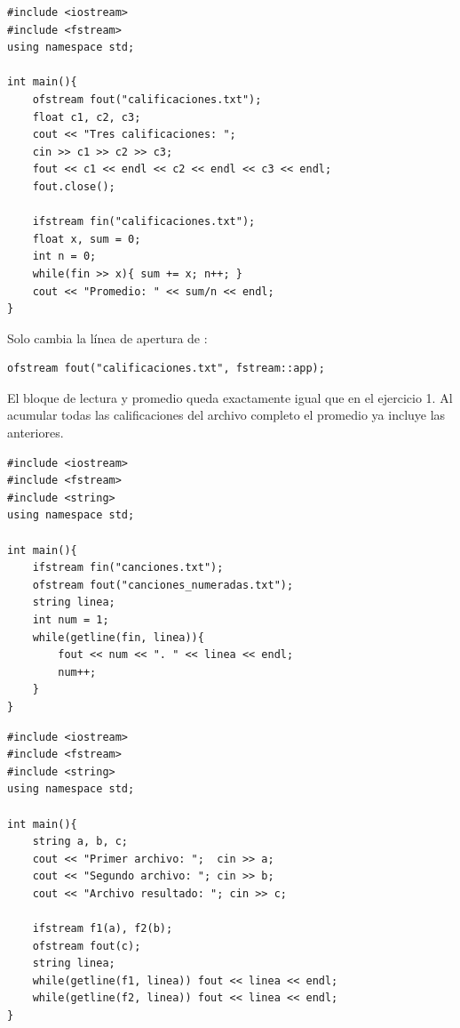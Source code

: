 \documentclass[12pt, oneside]{article}
\begin{document}
\begin{notaprofesor}
\begin{verbatim}
#include <iostream>
#include <fstream>
using namespace std;

int main(){
    ofstream fout("calificaciones.txt");
    float c1, c2, c3;
    cout << "Tres calificaciones: ";
    cin >> c1 >> c2 >> c3;
    fout << c1 << endl << c2 << endl << c3 << endl;
    fout.close();

    ifstream fin("calificaciones.txt");
    float x, sum = 0;
    int n = 0;
    while(fin >> x){ sum += x; n++; }
    cout << "Promedio: " << sum/n << endl;
}
\end{verbatim}
\end{notaprofesor}

\begin{notaprofesor}
  Solo cambia la línea de apertura de :
  \begin{verbatim}
ofstream fout("calificaciones.txt", fstream::app);
  \end{verbatim}
  El bloque de lectura y promedio queda exactamente igual que en el
  ejercicio 1.  Al acumular todas las calificaciones del archivo completo
  el promedio ya incluye las anteriores.
\end{notaprofesor}

\begin{notaprofesor}
\begin{verbatim}
#include <iostream>
#include <fstream>
#include <string>
using namespace std;

int main(){
    ifstream fin("canciones.txt");
    ofstream fout("canciones_numeradas.txt");
    string linea;
    int num = 1;
    while(getline(fin, linea)){
        fout << num << ". " << linea << endl;
        num++;
    }
}
\end{verbatim}
\end{notaprofesor}

\begin{notaprofesor}
\begin{verbatim}
#include <iostream>
#include <fstream>
#include <string>
using namespace std;

int main(){
    string a, b, c;
    cout << "Primer archivo: ";  cin >> a;
    cout << "Segundo archivo: "; cin >> b;
    cout << "Archivo resultado: "; cin >> c;

    ifstream f1(a), f2(b);
    ofstream fout(c);
    string linea;
    while(getline(f1, linea)) fout << linea << endl;
    while(getline(f2, linea)) fout << linea << endl;
}
\end{verbatim}
\end{notaprofesor}
\end{document}
